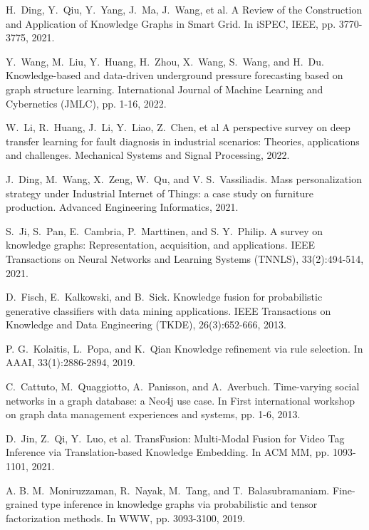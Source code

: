 \documentclass[11pt]{article}
\begin{document}
\begin{thebibliography}{10}
\begin{small}
 H.~Ding, Y.~Qiu, Y.~Yang, J.~Ma, J.~Wang, et al. \newblock A Review of the Construction and Application of Knowledge Graphs in Smart Grid. \newblock In iSPEC, IEEE, pp. 3770-3775, 2021.

 Y.~Wang, M.~Liu, Y.~Huang, H.~Zhou, X.~Wang, S.~Wang, and H.~Du. \newblock Knowledge-based and data-driven underground pressure forecasting based on graph structure learning. \newblock International Journal of Machine Learning and Cybernetics (JMLC), pp. 1-16, 2022.

 W.~Li, R.~Huang, J.~Li, Y.~Liao, Z.~Chen, et al \newblock A perspective survey on deep transfer learning for fault diagnosis in industrial scenarios: Theories, applications and challenges. \newblock Mechanical Systems and Signal Processing, 2022.

 J.~Ding, M.~Wang, X.~Zeng, W.~Qu, and V. S.~Vassiliadis. \newblock Mass personalization strategy under Industrial Internet of Things: a case study on furniture production. \newblock Advanced Engineering Informatics, 2021.

 S.~Ji, S.~Pan, E.~Cambria, P.~Marttinen, and S. Y.~Philip. \newblock A survey on knowledge graphs: Representation, acquisition, and applications. \newblock IEEE Transactions on Neural Networks and Learning Systems (TNNLS), 33(2):494-514, 2021.


 D.~Fisch, E.~Kalkowski, and B.~Sick. \newblock Knowledge fusion for probabilistic generative classifiers with data mining applications. \newblock IEEE Transactions on Knowledge and Data Engineering (TKDE), 26(3):652-666, 2013.

 P. G.~Kolaitis, L.~Popa, and K.~Qian  \newblock Knowledge refinement via rule selection. \newblock In AAAI, 33(1):2886-2894, 2019.

 C.~Cattuto, M.~Quaggiotto, A.~Panisson, and A.~Averbuch. \newblock Time-varying social networks in a graph database: a Neo4j use case. \newblock In First international workshop on graph data management experiences and systems, pp. 1-6, 2013.

 D.~Jin, Z.~Qi, Y.~Luo, et al. \newblock TransFusion: Multi-Modal Fusion for Video Tag Inference via Translation-based Knowledge Embedding. \newblock In ACM MM, pp. 1093-1101, 2021.

 A. B. M.~Moniruzzaman, R.~Nayak, M.~Tang, and T.~Balasubramaniam. \newblock Fine-grained type inference in knowledge graphs via probabilistic and tensor factorization methods. \newblock In WWW, pp. 3093-3100, 2019.


\end{small}
\end{thebibliography}
\end{document}

